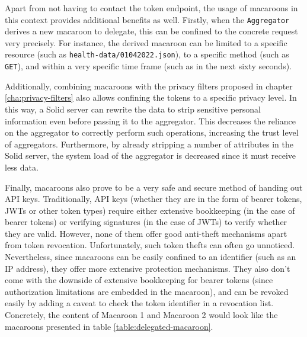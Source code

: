 Apart from not having to contact the token endpoint, the usage of macaroons in this context provides additional benefits as well. 
Firstly, when the \texttt{Aggregator} derives a new macaroon to delegate, this can be confined to the concrete request very precisely. For instance, the derived macaroon can be limited to a specific resource (such as \texttt{health-data/01042022.json}), to a specific method (such as \texttt{GET}), and within a very specific time frame (such as in the next sixty seconds). 

Additionally, combining macaroons with the privacy filters proposed in chapter \ref{cha:privacy-filters} also allows confining the tokens to a specific privacy level. In this way, a Solid server can rewrite the data to strip sensitive personal information even before passing it to the aggregator. This decreases the reliance on the aggregator to correctly perform such operations, increasing the trust level of aggregators. Furthermore, by already stripping a number of attributes in the Solid server, the system load of the aggregator is decreased since it must receive less data.

Finally, macaroons also prove to be a very safe and secure method of handing out API keys. Traditionally, API keys (whether they are in the form of bearer tokens, \gls{JWT}s or other token types) require either extensive bookkeeping (in the case of bearer tokens) or verifying signatures (in the case of \gls{JWT}s) to verify whether they are valid. However, none of them offer good anti-theft mechanisms apart from token revocation. Unfortunately, such token thefts can often go unnoticed. Nevertheless, since macaroons can be easily confined to an identifier (such as an IP address), they offer more extensive protection mechanisms. They also don't come with the downside of extensive bookkeeping for bearer tokens (since authorization limitations are embedded in the macaroon), and can be revoked easily by adding a caveat to check the token identifier in a revocation list. Concretely, the content of Macaroon 1 and Macaroon 2 would look like the macaroons presented in table \ref{table:delegated-macaroon}.

